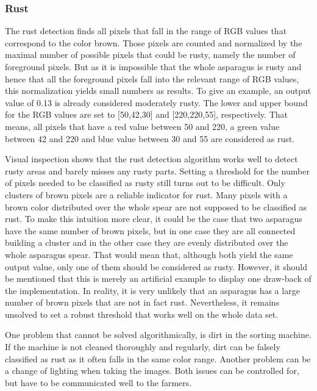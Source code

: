\subsubsection{Rust}
\label{subsec:Rust}

The rust detection finds all pixels that fall in the range of RGB values that correspond to the color brown. Those pixels are counted and normalized by the maximal number of possible pixels that could be rusty, namely the number of foreground pixels. But as it is impossible that the whole asparagus is rusty and hence that all the foreground pixels fall into the relevant range of RGB values, this normalization yields small numbers as results. To give an example, an output value of 0.13 is already considered moderately rusty. The lower and upper bound for the RGB values are set to [50,42,30] and [220,220,55], respectively. That means, all pixels that have a red value between 50 and 220, a green value between 42 and 220 and blue value between 30 and 55 are considered as rust.

Visual inspection shows that the rust detection algorithm works well to detect rusty areas and barely misses any rusty parts. Setting a threshold for the number of pixels needed to be classified as rusty still turns out to be difficult. Only clusters of brown pixels are a reliable indicator for rust.  Many pixels with a brown color distributed over the whole spear are not supposed to be classified as rust. To make this intuition more clear, it could be the case that two asparagus have the same number of brown pixels, but in one case they are all connected building a cluster and in the other case they are evenly distributed over the whole asparagus spear. That would mean that, although both yield the same output value, only one of them should be considered as rusty. However, it should be mentioned that this is merely an artificial example to display one draw-back of the implementation. In reality, it is very unlikely that an asparagus has a large number of brown pixels that are not in fact rust. Nevertheless, it remains unsolved to set a robust threshold that works well on the whole data set.

\bigskip
One problem that cannot be solved algorithmically, is dirt in the sorting machine. If the machine is not cleaned thoroughly and regularly, dirt can be falsely classified as rust as it often falls in the same color range. Another problem can be a change of lighting when taking the images. Both issues can be controlled for, but have to be communicated well to the farmers.

